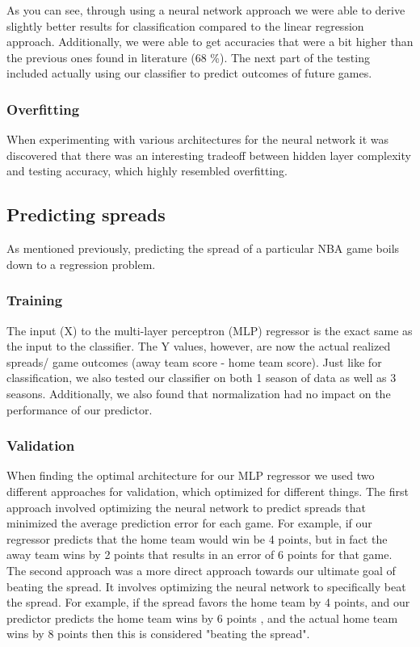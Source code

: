 \documentclass{article}
\begin{document}
As you can see, through using a neural network approach we were able to derive slightly better results for classification compared to the linear regression approach. Additionally, we were able to get accuracies that were a bit higher than the previous ones found in literature (68 \%). The next part of the testing included actually using our classifier to predict outcomes of future games. 

\subsubsection{Overfitting}
When experimenting with various architectures for the neural network it was discovered that there was an interesting tradeoff between hidden layer complexity and testing accuracy, which highly resembled overfitting. 

\subsection{Predicting spreads}
As mentioned previously, predicting the spread of a particular NBA game boils down to a regression problem.

\subsubsection{Training}
The input (X) to the multi-layer perceptron (MLP) regressor is the exact same as the input to the classifier. The Y values, however, are now the actual realized spreads/ game outcomes (away team score - home team score). Just like for classification, we also tested our classifier on both 1 season of data as well as 3 seasons. Additionally, we also found that normalization had no impact on the performance of our predictor. 

\subsubsection{Validation}
When finding the optimal architecture for our MLP regressor we used two different approaches for validation, which optimized for different things. The first approach involved optimizing the neural network to predict spreads that minimized the average prediction error for each game. For example, if our regressor predicts that the home team would win be 4 points, but in fact the away team wins by 2 points that results in an error of 6 points for that game. The second approach was a more direct approach towards our ultimate goal of beating the spread. It involves optimizing the neural network to specifically beat the spread. For example, if the spread favors the home team by 4 points, and our predictor predicts the home team wins by 6 points , and the actual home team wins by 8 points then this is considered "beating the spread". 
\end{document}
